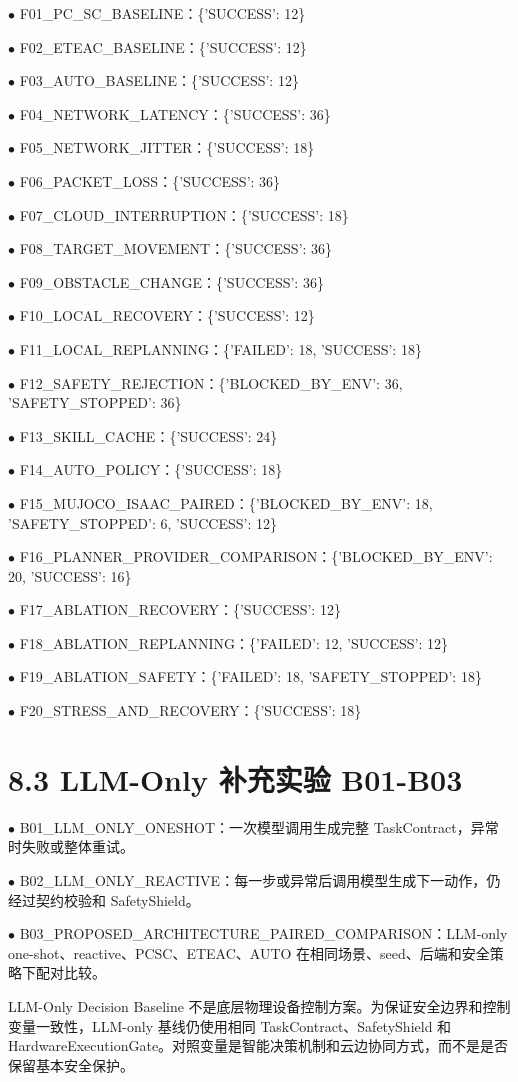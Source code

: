 \noindent $\bullet$ F01\_PC\_SC\_BASELINE：\{'SUCCESS': 12\}\par
\noindent $\bullet$ F02\_ETEAC\_BASELINE：\{'SUCCESS': 12\}\par
\noindent $\bullet$ F03\_AUTO\_BASELINE：\{'SUCCESS': 12\}\par
\noindent $\bullet$ F04\_NETWORK\_LATENCY：\{'SUCCESS': 36\}\par
\noindent $\bullet$ F05\_NETWORK\_JITTER：\{'SUCCESS': 18\}\par
\noindent $\bullet$ F06\_PACKET\_LOSS：\{'SUCCESS': 36\}\par
\noindent $\bullet$ F07\_CLOUD\_INTERRUPTION：\{'SUCCESS': 18\}\par
\noindent $\bullet$ F08\_TARGET\_MOVEMENT：\{'SUCCESS': 36\}\par
\noindent $\bullet$ F09\_OBSTACLE\_CHANGE：\{'SUCCESS': 36\}\par
\noindent $\bullet$ F10\_LOCAL\_RECOVERY：\{'SUCCESS': 12\}\par
\noindent $\bullet$ F11\_LOCAL\_REPLANNING：\{'FAILED': 18, 'SUCCESS': 18\}\par
\noindent $\bullet$ F12\_SAFETY\_REJECTION：\{'BLOCKED\_BY\_ENV': 36, 'SAFETY\_STOPPED': 36\}\par
\noindent $\bullet$ F13\_SKILL\_CACHE：\{'SUCCESS': 24\}\par
\noindent $\bullet$ F14\_AUTO\_POLICY：\{'SUCCESS': 18\}\par
\noindent $\bullet$ F15\_MUJOCO\_ISAAC\_PAIRED：\{'BLOCKED\_BY\_ENV': 18, 'SAFETY\_STOPPED': 6, 'SUCCESS': 12\}\par
\noindent $\bullet$ F16\_PLANNER\_PROVIDER\_COMPARISON：\{'BLOCKED\_BY\_ENV': 20, 'SUCCESS': 16\}\par
\noindent $\bullet$ F17\_ABLATION\_RECOVERY：\{'SUCCESS': 12\}\par
\noindent $\bullet$ F18\_ABLATION\_REPLANNING：\{'FAILED': 12, 'SUCCESS': 12\}\par
\noindent $\bullet$ F19\_ABLATION\_SAFETY：\{'FAILED': 18, 'SAFETY\_STOPPED': 18\}\par
\noindent $\bullet$ F20\_STRESS\_AND\_RECOVERY：\{'SUCCESS': 18\}\par

\section{8.3 LLM-Only 补充实验 B01-B03}

\noindent $\bullet$ B01\_LLM\_ONLY\_ONESHOT：一次模型调用生成完整 TaskContract，异常时失败或整体重试。\par
\noindent $\bullet$ B02\_LLM\_ONLY\_REACTIVE：每一步或异常后调用模型生成下一动作，仍经过契约校验和 SafetyShield。\par
\noindent $\bullet$ B03\_PROPOSED\_ARCHITECTURE\_PAIRED\_COMPARISON：LLM-only one-shot、reactive、PCSC、ETEAC、AUTO 在相同场景、seed、后端和安全策略下配对比较。\par

LLM-Only Decision Baseline 不是底层物理设备控制方案。为保证安全边界和控制变量一致性，LLM-only 基线仍使用相同 TaskContract、SafetyShield 和 HardwareExecutionGate。对照变量是智能决策机制和云边协同方式，而不是是否保留基本安全保护。\par
